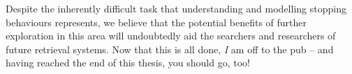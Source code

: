 Despite the inherently difficult task that understanding and modelling stopping behaviours represents, we believe that the potential benefits of further exploration in this area will undoubtedly aid the searchers and researchers of future retrieval systems. Now that this is all done, \emph{I} am off to the pub -- and having reached the end of this thesis, you should go, too!

\newpage
\thispagestyle{empty}
\mbox{}
\newpage
\thispagestyle{empty}
\mbox{}
\newpage